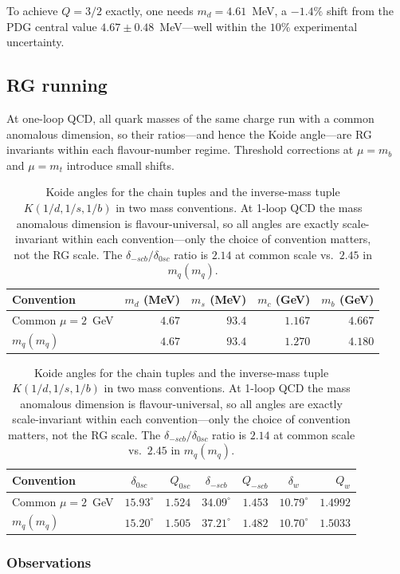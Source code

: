 \documentclass[11pt]{article}
\begin{document}
To achieve $Q = 3/2$ exactly, one needs
$m_d = 4.61$~MeV, a $-1.4\%$ shift from the PDG central value
$4.67 \pm 0.48$~MeV---well within the $10\%$ experimental
uncertainty.

\subsection{RG running}

At one-loop QCD, all quark masses of the same charge run with a
common anomalous dimension, so their ratios---and hence the Koide
angle---are RG invariants within each flavour-number regime.
Threshold corrections at $\mu = m_b$ and $\mu = m_t$ introduce
small shifts.

\begin{table}[h]
\centering
\small
\begin{tabular}{@{}l r r r r@{}}
\toprule
Convention & $m_d$ (MeV) & $m_s$ (MeV) & $m_c$ (GeV) & $m_b$ (GeV) \\
\midrule
Common $\mu = 2$~GeV & $4.67$ & $93.4$ & $1.167$ & $4.667$ \\
$m_q(m_q)$ & $4.67$ & $93.4$ & $1.270$ & $4.180$ \\
\bottomrule
\end{tabular}

\medskip

\begin{tabular}{@{}l c r c r c r@{}}
\toprule
Convention
  & $\delta_{0sc}$ & $Q_{0sc}$
  & $\delta_{-scb}$ & $Q_{-scb}$
  & $\delta_w$ & $Q_w$
  \\
\midrule
Common $\mu = 2$~GeV
  & $15.93^\circ$ & $1.524$
  & $34.09^\circ$ & $1.453$
  & $10.79^\circ$ & $1.4992$
  \\
$m_q(m_q)$
  & $15.20^\circ$ & $1.505$
  & $37.21^\circ$ & $1.482$
  & $10.70^\circ$ & $1.5033$
  \\
\bottomrule
\end{tabular}
\caption{Koide angles for the chain tuples and the inverse-mass tuple
  $K(1/d,1/s,1/b)$ in two mass conventions.
  At 1-loop QCD the mass anomalous dimension is flavour-universal,
  so all angles are exactly scale-invariant within each convention---only
  the choice of convention matters, not the RG scale.
  The $\delta_{-scb}/\delta_{0sc}$ ratio is $2.14$ at common scale
  vs.\ $2.45$ in $m_q(m_q)$.}
\label{tab:rg-angles}
\end{table}

\subsubsection*{Observations}
\end{document}
